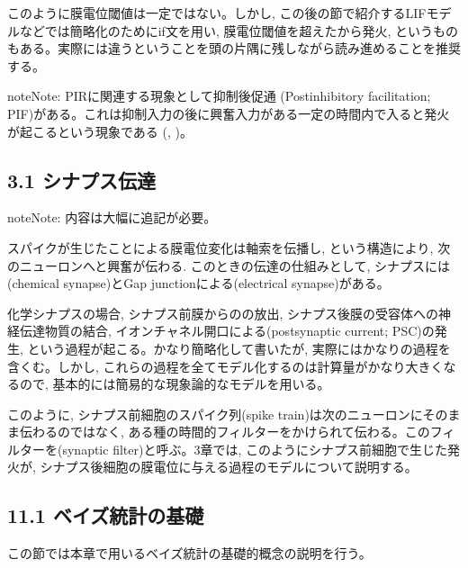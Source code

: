 \documentclass[letterpaper,10pt,english]{sphinxmanual}
\begin{document}
このように膜電位閾値は一定ではない。しかし, この後の節で紹介するLIFモデルなどでは簡略化のためにif文を用い, 膜電位閾値を超えたから発火, というものもある。実際には違うということを頭の片隅に残しながら読み進めることを推奨する。

\begin{sphinxadmonition}{note}{Note:}
PIRに関連する現象として抑制後促通 (Postinhibitory facilitation; PIF)がある。これは抑制入力の後に興奮入力がある一定の時間内で入ると発火が起こるという現象である (, )。
\end{sphinxadmonition}


\subsection{3.1 シナプス伝達}
\label{\detokenize{3-1_synapse:id1}}\label{\detokenize{3-1_synapse::doc}}
\begin{sphinxadmonition}{note}{Note:}
内容は大幅に追記が必要。
\end{sphinxadmonition}

スパイクが生じたことによる膜電位変化は軸索を伝播し, という構造により, 次のニューロンへと興奮が伝わる. このときの伝達の仕組みとして, シナプスには(chemical synapse)とGap junctionによる(electrical synapse)がある。

化学シナプスの場合, シナプス前膜からのの放出, シナプス後膜の受容体への神経伝達物質の結合, イオンチャネル開口による(postsynaptic current; PSC)の発生, という過程が起こる。かなり簡略化して書いたが, 実際にはかなりの過程を含くむ。しかし, これらの過程を全てモデル化するのは計算量がかなり大きくなるので, 基本的には簡易的な現象論的なモデルを用いる。

このように, シナプス前細胞のスパイク列(spike train)は次のニューロンにそのまま伝わるのではなく, ある種の時間的フィルターをかけられて伝わる。このフィルターを(synaptic filter)と呼ぶ。3章では, このようにシナプス前細胞で生じた発火が, シナプス後細胞の膜電位に与える過程のモデルについて説明する。


\subsection{11.1 ベイズ統計の基礎}
\label{\detokenize{11-1_bayes_statistics:id1}}\label{\detokenize{11-1_bayes_statistics::doc}}
この節では本章で用いるベイズ統計の基礎的概念の説明を行う。
\end{document}
